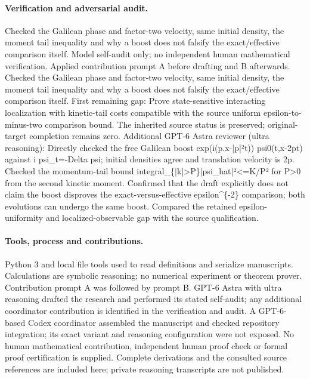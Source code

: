 \documentclass[11pt]{article}
\begin{document}
\paragraph{Verification and adversarial audit.}
Checked the Galilean phase and factor-two velocity, same initial density, the moment tail inequality and why a boost does not falsify the exact/effective comparison itself. Model self-audit only; no independent human mathematical verification. Applied contribution prompt A before drafting and B afterwards. Checked the Galilean phase and factor-two velocity, same initial density, the moment tail inequality and why a boost does not falsify the exact/effective comparison itself. First remaining gap: Prove state-sensitive interacting localization with kinetic-tail costs compatible with the source uniform epsilon-to-minus-two comparison bound. The inherited source status is preserved; original-target completion remains zero. Additional GPT-6 Astra reviewer (ultra reasoning): Directly checked the free Galilean boost exp(i(p.x-|p|²t)) psi0(t,x-2pt) against i psi\_t=-Delta psi; initial densities agree and translation velocity is 2p. Checked the momentum-tail bound integral\_\{|k|>P\}|psi\_hat|²<=K/P² for P>0 from the second kinetic moment. Confirmed that the draft explicitly does not claim the boost disproves the exact-versus-effective epsilon\textasciicircum{}\{-2\} comparison; both evolutions can undergo the same boost. Compared the retained epsilon-uniformity and localized-observable gap with the source qualification.

\paragraph{Tools, process and contributions.}
Python 3 and local file tools used to read definitions and serialize manuscripts. Calculations are symbolic reasoning; no numerical experiment or theorem prover. Contribution prompt A was followed by prompt B. GPT-6 Astra with ultra reasoning drafted the research and performed its stated self-audit; any additional coordinator contribution is identified in the verification and audit. A GPT-6-based Codex coordinator assembled the manuscript and checked repository integration; its exact variant and reasoning configuration were not exposed. No human mathematical contribution, independent human proof check or formal proof certification is supplied. Complete derivations and the consulted source references are included here; private reasoning transcripts are not published.
\end{document}
